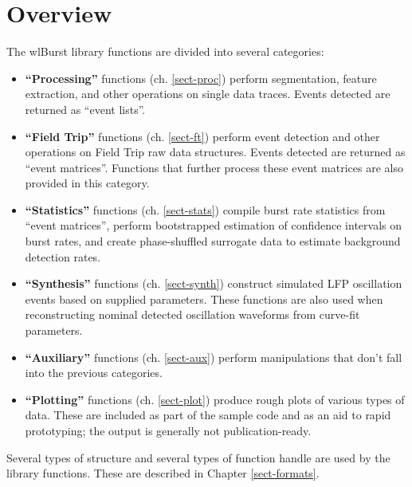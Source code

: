 
\chapter{Overview}
\label{sect-over}

The wlBurst library functions are divided into several categories:
\begin{itemize}
%
\item \textbf{``Processing''} functions (ch. \ref{sect-proc}) perform
segmentation, feature extraction, and other operations on single data
traces. Events detected are returned as ``event lists''.
%
\item \textbf{``Field Trip''} functions (ch. \ref{sect-ft}) perform event
detection and other operations on Field Trip raw data structures. Events
detected are returned as ``event matrices''. Functions that further process
these event matrices are also provided in this category.
%
\item \textbf{``Statistics''} functions (ch. \ref{sect-stats}) compile
burst rate statistics from ``event matrices'', perform bootstrapped
estimation of confidence intervals on burst rates, and create phase-shuffled
surrogate data to estimate background detection rates.
%
\item \textbf{``Synthesis''} functions (ch. \ref{sect-synth}) construct
simulated LFP oscillation events based on supplied parameters. These
functions are also used when reconstructing nominal detected oscillation
waveforms from curve-fit parameters.
%
\item \textbf{``Auxiliary''} functions (ch. \ref{sect-aux}) perform
manipulations that don't fall into the previous categories.
%
\item \textbf{``Plotting''} functions (ch. \ref{sect-plot}) produce rough
plots of various types of data. These are included as part of the sample
code and as an aid to rapid prototyping; the output is generally not
publication-ready.
%
\end{itemize}

Several types of structure and several types of function handle are used by
the library functions. These are described in Chapter \ref{sect-formats}.

%
